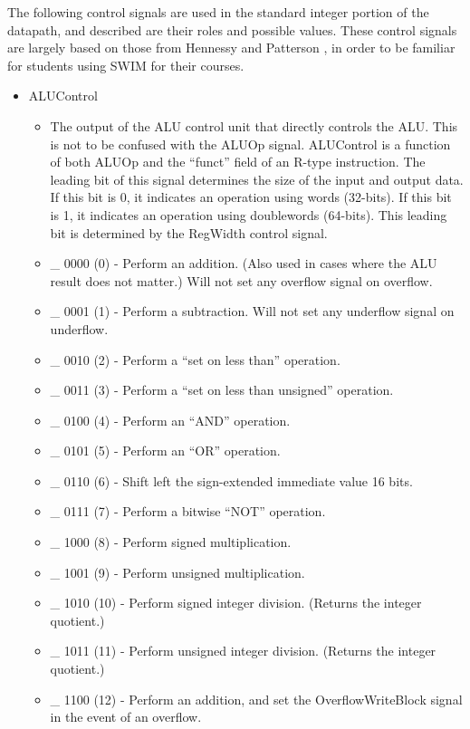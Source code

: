 \documentclass[
    paper=letter,
    parskip=half,
    fontsize=12pt,
    titlepage=firstiscover,
    toc=bibliography,
    numbers=endperiod
]{scrartcl}
\providecommand{\tightlist}{%
  \setlength{\itemsep}{0pt}\setlength{\parskip}{0pt}}
\begin{document}
The following control signals are used in the standard integer portion
of the datapath, and described are their roles and possible values.
These control signals are largely based on those from Hennessy and
Patterson \cite{hennessy-patterson}, in order to be familiar for
students using SWIM for their courses.

\begin{itemize}
    \item ALUControl
          \begin{itemize}
              \tightlist
              \item The output of the ALU control unit that directly controls the ALU. This
                    is not to be confused with the ALUOp signal. ALUControl is a function of
                    both ALUOp and the ``funct'' field of an R-type instruction. The leading
                    bit of this signal determines the size of the input and output data. If
                    this bit is 0, it indicates an operation using words (32-bits). If this
                    bit is 1, it indicates an operation using doublewords (64-bits). This
                    leading bit is determined by the RegWidth control signal.
              \item \_ 0000 (0) - Perform an addition. (Also used in cases where the ALU result does not matter.) Will not set any overflow signal on overflow.
              \item \_ 0001 (1) - Perform a subtraction. Will not set any underflow signal on underflow.
              \item \_ 0010 (2) - Perform a ``set on less than'' operation.
              \item \_ 0011 (3) - Perform a ``set on less than unsigned'' operation.
              \item \_ 0100 (4) - Perform an ``AND'' operation.
              \item \_ 0101 (5) - Perform an ``OR'' operation.
              \item \_ 0110 (6) - Shift left the sign-extended immediate value 16 bits.
              \item \_ 0111 (7) - Perform a bitwise ``NOT'' operation.
              \item \_ 1000 (8) - Perform signed multiplication.
              \item \_ 1001 (9) - Perform unsigned multiplication.
              \item \_ 1010 (10) - Perform signed integer division. (Returns the integer quotient.)
              \item \_ 1011 (11) - Perform unsigned integer division. (Returns the integer quotient.)
              \item \_ 1100 (12) - Perform an addition, and set the OverflowWriteBlock signal in the event of an overflow.
          \end{itemize}


\end{itemize}
\end{document}
